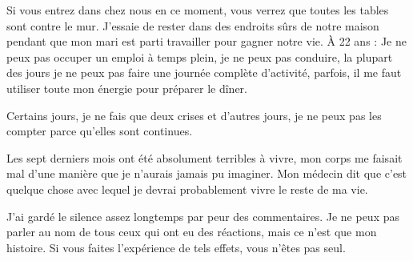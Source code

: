 Si vous entrez dans chez nous en ce moment, vous verrez que toutes les tables
sont contre le mur. J'essaie de rester dans des endroits sûrs de notre maison
pendant que mon mari est parti travailler pour gagner notre vie. À 22 ans : Je
ne peux pas occuper un emploi à temps plein, je ne peux pas conduire, la plupart
des jours je ne peux pas faire une journée complète d'activité, parfois, il me
faut utiliser toute mon énergie pour préparer le dîner.

Certains jours, je ne fais que deux crises et d'autres jours, je ne peux pas les
compter parce qu'elles sont continues.

Les sept derniers mois ont été absolument terribles à vivre, mon corps me
faisait mal d'une manière que je n'aurais jamais pu imaginer. Mon médecin dit
que c'est quelque chose avec lequel je devrai probablement vivre le reste de ma
vie.

J'ai gardé le silence assez longtemps par peur des commentaires. Je ne peux pas
parler au nom de tous ceux qui ont eu des réactions, mais ce n'est que mon
histoire. Si vous faites l'expérience de tels effets, vous n'êtes pas seul.

